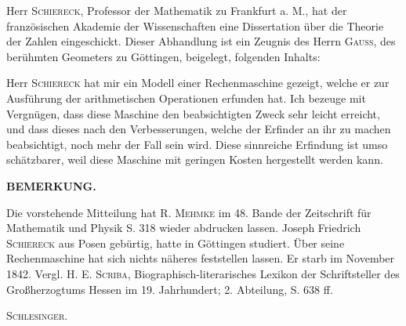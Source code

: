 \NoSourceHead
{}

Herr \textsc{Schiereck}, Professor der Mathematik zu Frankfurt a. M., hat der französischen Akademie der Wissenschaften eine Dissertation über die Theorie der Zahlen eingeschickt. Dieser Abhandlung ist ein Zeugnis des Herrn \textsc{Gauss}, des berühmten Geometers zu Göttingen, beigelegt, folgenden Inhalts:

Herr \textsc{Schiereck} hat mir ein Modell einer Rechenmaschine gezeigt, welche er zur Ausführung der arithmetischen Operationen erfunden hat. Ich bezeuge mit Vergnügen, dass diese Maschine den beabsichtigten Zweck sehr leicht erreicht, und dass dieses nach den Verbesserungen, welche der Erfinder an ihr zu machen beabsichtigt, noch mehr der Fall sein wird. Diese sinnreiche Erfindung ist umso schätzbarer, weil diese Maschine mit geringen Kosten hergestellt werden kann.

\bigskip\begin{center}\small\textbf{BEMERKUNG.}\end{center}
\begingroup\small\par\indent
Die vorstehende Mitteilung hat R. \textsc{Mehmke} im 48. Bande der Zeitschrift für Mathematik und Physik S. 318 wieder abdrucken lassen. Joseph Friedrich \textsc{Schiereck} aus Posen gebürtig, hatte in Göttingen studiert. Über seine Rechenmaschine hat sich nichts näheres feststellen lassen. Er starb im November 1842. Vergl. H. E. \textsc{Scriba}, Biographisch-literarisches Lexikon der Schriftsteller des Großherzogtums Hessen im 19. Jahrhundert; 2. Abteilung, S. 638 ff.
\begin{flushright}\textsc{Schlesinger}.\end{flushright}
\endgroup
\ClosingRule
\clearpage
